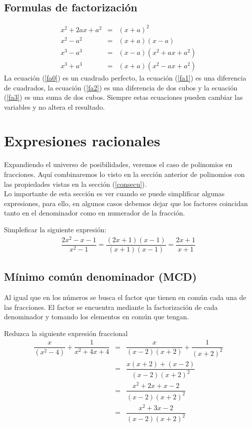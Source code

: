 \subsection{Formulas de factorización}
\label{facto}
\begin{eqnarray}
 x^{2}+2ax+a^{2}&=&(x+a)^{2} \label{fa0}\\
 x^{2}-a^{2}&=&(x+a)(x-a) \label{fa1}\\
 x^{3}-a^{3}&=&(x-a)(x^{2}+ax+a^{2})\label{fa2} \\
x^{3}+a^{3} &=& (x+a)(x^{2}-ax+a^{2}) \label{fa3}
\end{eqnarray}
La ecuación (\ref{fa0}) es un cuadrado perfecto, la ecuación (\ref{fa1}) es una diferencia de cuadrados, la ecuación (\ref{fa2}) es una diferencia de dos cubos y la ecuación (\ref{fa3}) es una suma de dos cubos. Siempre estas ecuaciones pueden cambiar las variables y no altera el resultado.

\section{Expresiones racionales}
Expandiendo el universo de posibilidades, veremos el caso de polinomios en fracciones. Aquí combinaremos lo visto en la sección anterior de polinomios con las propiedades vistas en la sección (\ref{consecu}).\\
Lo importante de esta sección es ver cuando se puede simplificar algunas expresiones, para ello, en algunos casos debemos dejar que los factores coincidan tanto en el denominador como en numerador de la fracción.\\
\begin{myexample}
Simpleficar la siguiente expresión:
\begin{eqnarray*}
\dfrac{2x^{2}-x-1}{x^{2}-1}=\dfrac{(2x+1)(x-1)}{(x+1)(x-1)}=\dfrac{2x+1}{x+1}
\end{eqnarray*}
\end{myexample}

\subsection{Mínimo común denominador (MCD)}
Al igual que en los números se busca el factor que tienen en común cada una de las fracciones. El factor se encuentra mediante la factorización de cada denominador y tomando los elementos en común que tengan. 

\begin{myexample}
Reduzca la siguiente expresión fraccional
\begin{eqnarray*}
\dfrac{x}{(x^{2}-4)}+\dfrac{1}{x^{2}+4x+4}&=& \dfrac{x}{(x-2)(x+2)}+\dfrac{1}{(x+2)^{2}}\\
&=&\dfrac{x(x+2)+(x-2)}{(x-2)(x+2)^{2}}\\
&=&\dfrac{x^{2}+2x+x-2}{(x-2)(x+2)^{2}}\\
&=&\dfrac{x^{2}+3x-2}{(x-2)(x+2)^{2}}\\
\end{eqnarray*}
\end{myexample}


